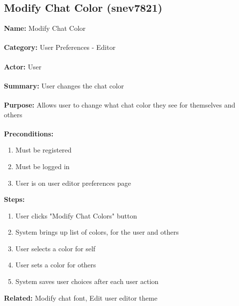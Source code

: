 \documentclass[11pt]{report}
\begin{document}
\subsection{Modify Chat Color (snev7821)}
\begin{framed}
	\noindent\textbf{Name:} Modify Chat Color \\ \\
	\textbf{Category:} User Preferences - Editor  \\ \\
	\textbf{Actor:} User \\ \\
	\textbf{Summary:} User changes the chat color \\ \\
	\textbf{Purpose:} Allows user to change what chat color they see for themselves and others \\ \\
	\textbf{Preconditions:} 
	\begin{enumerate}
		\item Must be registered
		\item Must be logged in
		\item User is on user editor preferences page
	\end{enumerate}
	\textbf{Steps:}
	\begin{enumerate}
		\item User clicks "Modify Chat Colors" button
		\item System brings up list of colors, for the user and others
		\item User selects a color for self
		\item User sets a color for others
		\item System saves user choices after each user action
	\end{enumerate}
	\textbf{Related:} Modify chat font, Edit user editor theme
\end{framed}

\newpage
\end{document}
